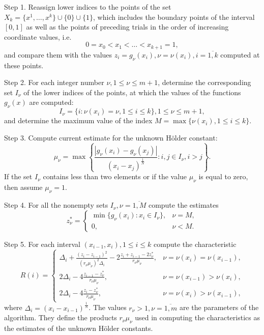 \documentclass[runningheads]{llncs}
\begin{document}
Step 1. Reassign lower indices to the points of the set \(X_k=\{x^1,\dotsc,x^k\}\cup\{0\}\cup\{1\}\), which
includes the boundary points of the interval \([0,1]\) as well as the points of preceding trials in the order of increasing coordinate values, i.e.
\begin{equation}
  \label{eq:points}
  0=x_0<x_1<\dotsc<x_{k+1}=1,
\end{equation}
and compare them with the values \(z_{i}=g_{\nu }(x_{i}),\nu =\nu (x_{i}),i={\overline {1,k}}\) computed at these points.

Step 2. For each integer number \(\nu ,1\leqslant \nu \leqslant m+1\), determine the corresponding
set \(I_{\nu }\) of the lower indices of the points, at which the values of the functions \(g_{\nu
}(x)\) are computed:
\begin{displaymath}
  I_{\nu }=\{i:\nu (x_{i})=\nu ,1\leqslant i\leqslant k\},1\leq \nu \leqslant m+1,
\end{displaymath}
and determine the maximum value of the index \(M=\max\{\nu (x_{i}),1\leq i\leq k\}\).

Step 3. Compute current estimate for the unknown H\"{o}lder constant:
\begin{equation}
  \label{step2}
  \mu _{\nu }=\max \left\{ \frac{|g_{\nu }(x_{i})-g_{\nu }(x_{j})|}{(x_{i}-
x_{j})^{\frac{1}{N}}}:i,j\in I_{\nu },i>j \right\}.
\end{equation}
If the set \(I_{\nu }\) contains less than two elements or if the value \(\mu _{\nu }\) is equal to zero, then assume \(\mu _{\nu }=1\).

Step 4. For all the nonempty sets \(I_{\nu },\nu ={\overline {1,M}}\) compute the estimates
\begin{equation}
  \label{eq:step_4}
  z_{\nu }^{*}={\begin{cases}\min\{g_{\nu }(x_{i}):x_{i}\in I_{\nu }\},&\nu =M,\\
  0,&\nu <M.\end{cases}}
\end{equation}

Step 5. For each interval \((x_{i-1},x_{i}),1\leqslant i\leqslant k\) compute the characteristic
\begin{equation}
  \label{step3_1}
  R(i)={\begin{cases}\Delta _{i}+{\frac {(z_{i}-z_{i-1})^{2}}{(r_{\nu }\mu _{\nu
})^{2}\Delta _{i}}}-2{\frac {z_{i}+z_{i-1}-2z_{\nu }^{*}}{r_{\nu }\mu _{\nu }}},&\nu =\nu
(x_{i})=\nu (x_{i-1}),\\2\Delta _{i}-4{\frac {z_{i-1}-z_{\nu }^{*}}{r_{\nu }\mu _{\nu
}}},&\nu =\nu (x_{i-1})>\nu (x_{i}),\\2\Delta _{i}-4{\frac {z_{i}-z_{\nu }^{*}}{r_{\nu }\mu
_{\nu }}},&\nu =\nu (x_{i})>\nu (x_{i-1}),\end{cases}}
\end{equation}
where \(\Delta_{i}=(x_{i}-x_{i-1})^{\frac{1}{N}}\).
The values \(r_{\nu }>1,\nu ={\overline {1,m}}\) are the parameters of the algorithm.
They define the products \(r_{\nu}\mu_{\nu}\) used in computing the characteristics as the estimates of the
unknown H\"{o}lder constants.
\end{document}
